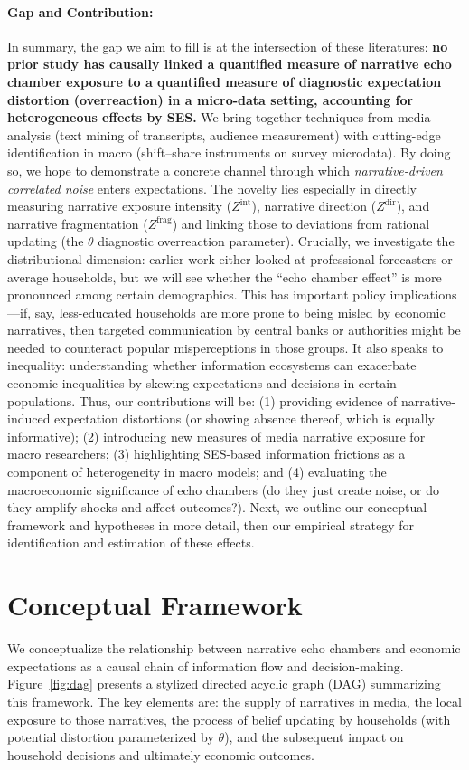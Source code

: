 \documentclass[12pt]{article}
\begin{document}
\paragraph{Gap and Contribution:} In summary, the gap we aim to fill is at the intersection of these literatures: \textbf{no prior study has causally linked a quantified measure of narrative echo chamber exposure to a quantified measure of diagnostic expectation distortion (overreaction) in a micro-data setting, accounting for heterogeneous effects by SES.} We bring together techniques from media analysis (text mining of transcripts, audience measurement) with cutting-edge identification in macro (shift--share instruments on survey microdata). By doing so, we hope to demonstrate a concrete channel through which \emph{narrative-driven correlated noise} enters expectations. The novelty lies especially in directly measuring narrative exposure intensity ($Z^{\text{int}}$), narrative direction ($Z^{\text{dir}}$), and narrative fragmentation ($Z^{\text{frag}}$) and linking those to deviations from rational updating (the $\theta$ diagnostic overreaction parameter).
Crucially, we investigate the distributional dimension: earlier work either looked at professional forecasters or average households, but we will see whether the ``echo chamber effect'' is more pronounced among certain demographics. This has important policy implications—if, say, less-educated households are more prone to being misled by economic narratives, then targeted communication by central banks or authorities might be needed to counteract popular misperceptions in those groups. It also speaks to inequality: understanding whether information ecosystems can exacerbate economic inequalities by skewing expectations and decisions in certain populations.
Thus, our contributions will be: (1) providing evidence of narrative-induced expectation distortions (or showing absence thereof, which is equally informative); (2) introducing new measures of media narrative exposure for macro researchers; (3) highlighting SES-based information frictions as a component of heterogeneity in macro models; and (4) evaluating the macroeconomic significance of echo chambers (do they just create noise, or do they amplify shocks and affect outcomes?).
Next, we outline our conceptual framework and hypotheses in more detail, then our empirical strategy for identification and estimation of these effects.
\section{Conceptual Framework}
We conceptualize the relationship between narrative echo chambers and economic expectations as a causal chain of information flow and decision-making. Figure~\ref{fig:dag} presents a stylized directed acyclic graph (DAG) summarizing this framework. The key elements are: the supply of narratives in media, the local exposure to those narratives, the process of belief updating by households (with potential distortion parameterized by $\theta$), and the subsequent impact on household decisions and ultimately economic outcomes.
\end{document}
